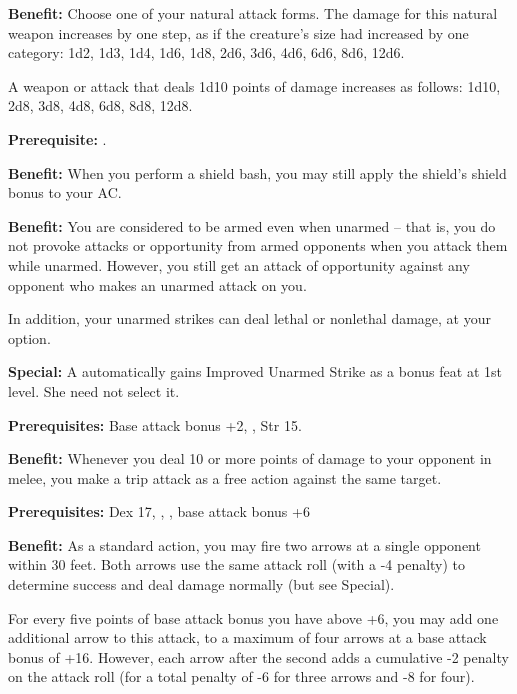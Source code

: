 \textbf{Benefit:} Choose one of your natural attack forms. The damage for this natural weapon increases by one step, as if the creature's size had increased by one category: 1d2, 1d3, 1d4, 1d6, 1d8, 2d6, 3d6, 4d6, 6d6, 8d6, 12d6. 

A weapon or attack that deals 1d10 points of damage increases as follows: 1d10, 2d8, 3d8, 4d8, 6d8, 8d8, 12d8.


\textbf{Prerequisite:} .

\textbf{Benefit:} When you perform a shield bash, you may still apply the shield's shield bonus to your AC.


\textbf{Benefit:} You are considered to be armed even when unarmed  -- that is, you do not provoke attacks or opportunity from armed opponents when you attack them while unarmed. However, you still get an attack of opportunity against any opponent who makes an unarmed attack on you.

In addition, your unarmed strikes can deal lethal or nonlethal damage, at your option.

\textbf{Special:} A  automatically gains Improved Unarmed Strike as a bonus feat at 1st level. She need not select it.


\textbf{Prerequisites:} Base attack bonus +2, , Str 15.

\textbf{Benefit:} Whenever you deal 10 or more points of damage to your opponent in melee, you make a trip attack as a free action against the same target.


\textbf{Prerequisites:} Dex 17, , , base attack bonus 
+6

\textbf{Benefit:} As a standard action, you may fire two arrows at a single opponent within 30 feet. Both arrows use the same attack roll (with a -4 penalty) to determine success and deal damage normally (but see Special).

For every five points of base attack bonus you have above +6, you may add one additional arrow to this attack, to a maximum of four arrows at a base attack bonus of +16. However, each arrow after the second adds a cumulative -2 penalty on the attack roll (for a total penalty of -6 for three arrows and -8 for four).

